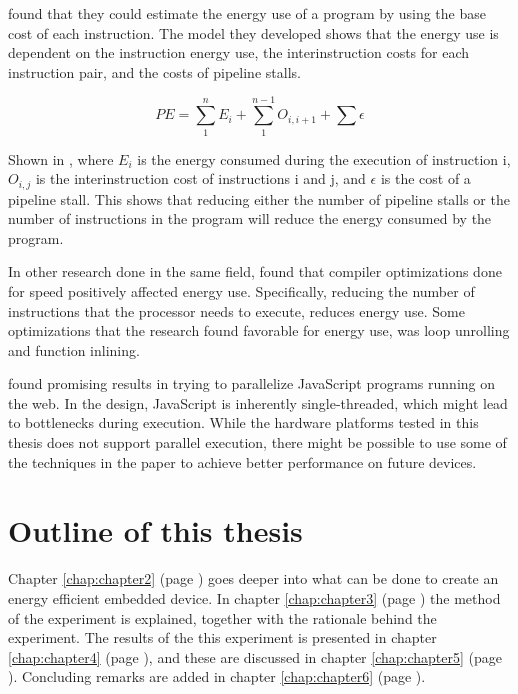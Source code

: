 \citet{kavvadias04} found that they could estimate the energy use of a program by using the base cost of each instruction.
The model they developed shows that the energy use is dependent on the instruction energy use, the interinstruction costs for each instruction pair, and the costs of pipeline stalls.

\begin{equation}
PE = \sum_{1}^{n}E_{i} + \sum_{1}^{n-1}O_{i,i+1} + \sum\epsilon
\label{eq:kavvadiasmodel}
\end{equation}

Shown in , where $E_i$ is the energy consumed during the execution of instruction i, $O_{i,j}$ is the interinstruction cost of instructions i and j, and $\epsilon$ is the cost of a pipeline stall.
This shows that reducing either the number of pipeline stalls or the number of instructions in the program will reduce the energy consumed by the program.

In other research done in the same field, \citet{valluri01} found that compiler optimizations done for speed positively affected energy use.
Specifically, reducing the number of instructions that the processor needs to execute, reduces energy use.
Some optimizations that the research found favorable for energy use, was loop unrolling and function inlining.

\citet{fortunaanderson2010} found promising results in trying to parallelize JavaScript programs running on the web.
In the design, JavaScript is inherently single-threaded, which might lead to bottlenecks during execution.
While the hardware platforms tested in this thesis does not support parallel execution, there might be possible to use some of the techniques in the paper to achieve better performance on future devices.





\section{Outline of this thesis}
Chapter \ref{chap:chapter2} (page \pageref{chap:chapter2}) goes deeper into what can be done to create an energy efficient embedded device.
In chapter \ref{chap:chapter3} (page \pageref{chap:chapter3}) the method of the experiment is explained, together with the rationale behind the experiment.
The results of the this experiment is presented in chapter \ref{chap:chapter4} (page \pageref{chap:chapter4}), and these are discussed in chapter \ref{chap:chapter5} (page \pageref{chap:chapter5}).
Concluding remarks are added in chapter \ref{chap:chapter6} (page \pageref{chap:chapter6}).